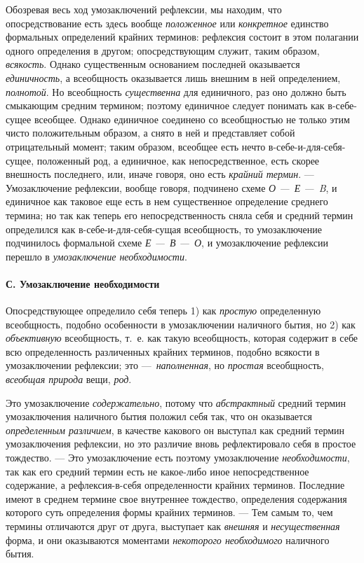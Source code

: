 \documentclass[twoside]{article}
\begin{document}
{{{{{{Обозревая весь ход умозаключений рефлексии, мы находим, что
опосредствование есть здесь вообще
{\em положенное} или
{\em конкретное} единство
формальных определений крайних терминов: рефлексия состоит в этом полагании
одного определения в другом; опосредствующим служит, таким образом,
{\em всякость}. Однако
существенным основанием последней оказывается
{\em единичность}, а
всеобщность оказывается лишь внешним в ней определением,
{\em полнотой}. Но
всеобщность {\em существенна}
для единичного, раз оно должно быть смыкающим средним
термином; поэтому единичное следует понимать как в-себе-сущее всеобщее.
Однако единичное соединено со всеобщностью не только этим чисто
положительным образом, а снято в ней и представляет собой отрицательный
момент; таким образом, всеобщее есть нечто в-себе-и-для-себя-сущее,
положенный род, а единичное, как непосредственное, есть скорее внешность
последнего, или, иначе говоря, оно есть
{\em крайний термин}. —
Умозаключение рефлексии, вообще говоря, подчинено схеме
{\em О —~Е —~B},
и единичное как таковое еще есть в нем существенное
определение среднего термина; но так как теперь его непосредственность
сняла себя и средний термин определился как
в-себе-и-для-себя-сущая всеобщность, то умозаключение
подчинилось формальной схеме {\em Е
—~В —~О}, и умозаключение
рефлексии перешло в {\em умозаключение
необходимости}.

\paragraph[С. Умозаключение необходимости]{С. Умозаключение необходимости}
Опосредствующее определило себя теперь 1) как
{\em простую}
определенную всеобщность, подобно особенности в умозаключении
наличного бытия, но 2) как
{\em объективную}
всеобщность, т.~е. как такую всеобщность, которая содержит в
себе всю определенность различенных крайних терминов, подобно всякости в
умозаключении рефлексии; это
—~{\em наполненная}, но
{\em простая}
всеобщность, {\em всеобщая
природа} вещи,
{\em род}.

Это умозаключение
{\em содержательно},
потому что
{\em абстрактный} средний
термин умозаключения наличного бытия положил себя так, что он оказывается
{\em определенным различием},
в качестве какового он выступал как средний термин
умозаключения рефлексии, но это различие вновь рефлектировало себя в
простое тождество. — Это умозаключение есть поэтому
умозаключение {\em необходимости},
так как его средний термин есть не какое-либо иное
непосредственное содержание, а рефлексия-в-себя определенности крайних
терминов. Последние имеют в среднем термине свое внутреннее тождество,
определения содержания которого суть определения формы крайних терминов. —
Тем самым то, чем термины отличаются друг от друга, выступает
как {\em внешняя} и
{\em несущественная}
форма, и они оказываются моментами
{\em некоторого необходимого}
наличного бытия.

}}}}}}
\end{document}
